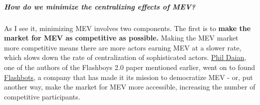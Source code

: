 \documentclass[12pt]{article}
\begin{document}
\subparagraph{\textit{How do we minimize the centralizing effects of MEV?}}



As I see it, minimizing MEV involves two components. The first is to \textbf{make the market for MEV as competitive as possible.} Making the MEV market more competitive means there are more actors earning MEV at a slower rate, which slows down the rate of centralization of sophisticated actors. \href{https://x.com/phildaian}{Phil Daian}, one of the authors of the Flashboys 2.0 paper mentioned earlier, went on to found \href{https://www.flashbots.net/}{Flashbots}, a company that has made it its mission to democratize MEV - or, put another way, make the market for MEV more accessible, increasing the number of competitive participants. 

\clearpage

\end{document}
